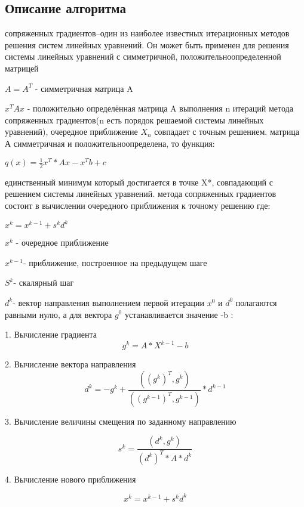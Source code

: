 \documentclass{report}
\begin{document}
\begin{center}
\section*{Описание алгоритма}
\end{center}
 сопряженных градиентов–один из наиболее известных итерационных методов решения систем линейных уравнений. Он может быть применен для решения системы линейных уравнений с симметричной, положительноопределенной матрицей
\par$A = A^T $ - симметричная матрица A 
\par$x^T A x$ - положительно определённая матрица A 
 выполнения n итераций метода сопряженных градиентов(n есть порядок решаемой системы линейных уравнений), очередное приближение $X_n$ совпадает с точным решением.
 матрица А симметричная и положительноопределена, то функция:
\begin {center}
$q(x) =  \frac{1}{2} x^T * Ax - x^Tb + c$
\end {center}
 единственный минимум который достигается в точке X*, совпадающий с решением системы линейных уравнений.
 метода сопряженных градиентов состоит в вычислении очередного приближения к точному решению
где:
\begin {center}
$x^k = x^{k-1} + s^k d^k$
\end {center}

\par $x^k$ - очередное приближение
\par $x^{k-1}$- приближение, построенное на предыдущем шаге
\par $S^k$- скалярный шаг
\par $d^k$- вектор направления
 выполнением первой итерации $x^0$ и $d^0$ полагаются равными нулю, а для вектора $g^0$ устанавливается значение -b
:

1. Вычисление градиента
$$g^k=A*X^{k-1}-b$$

2.   Вычисление вектора направления
$$d^k= -g^k + \frac{((g^k)^T, g^k)}{((g^{k-1})^T, g^{k-1})} * d^{k-1}$$


3.   Вычисление величины смещения по заданному направлению

$$s^k = \frac{(d^k, g^k)}{(d^k)^T * A * d^k}$$

4.   Вычисление нового приближения

$$x^k = x^{k-1} + s^k d^k$$
\end{document}

